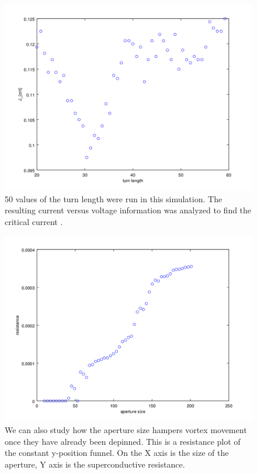 \begin{figure}[htbp]
\begin{center}
\includegraphics[scale=.50]{kinkScan.png}
\caption{ 50 values of the turn length were run in this simulation. The resulting current versus voltage information was analyzed to find the critical current .  }
\label{normalYscan}
\end{center}
\end{figure}



\begin{figure}[htbp]
\begin{center}
\includegraphics[scale=.50]{AvR.png}
\caption{ We can also study how the aperture size hampers vortex movement once they have already been depinned. This is a resistance plot of the constant y-position funnel. On the X axis is the size of the aperture, Y axis is the superconductive resistance. }
\label{AvR}
\end{center}
\end{figure}

